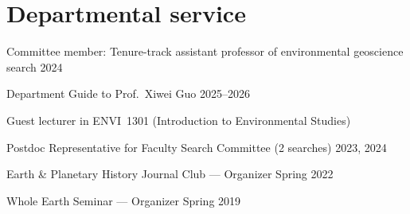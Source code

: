 \section{Departmental service}


Committee member: Tenure-track assistant professor of environmental geoscience search \hfill 2024

Department Guide to Prof.~Xiwei Guo \hfill 2025--2026

Guest lecturer in ENVI~1301 (Introduction to Environmental Studies)


Postdoc Representative for Faculty Search Committee (2 searches) \hfill 2023, 2024

Earth \& Planetary History Journal Club --- Organizer 	 \hfill	Spring 2022

Whole Earth Seminar --- Organizer \hfill  Spring 2019